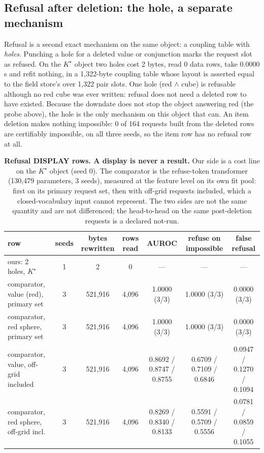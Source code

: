 \documentclass{article} %
\newcommand{\Kstar}{\ensuremath{K^{\star}}}
\begin{document}
\subsection{Refusal after deletion: the hole, a separate mechanism}
\label{sec:hole}

Refusal is a second exact mechanism on the same object: a coupling table with \emph{holes}.
Punching a hole for a deleted value or conjunction marks the request slot as refused. On the
$\Kstar$ object two holes cost 2 bytes, read 0 data rows, take 0.0000 s and refit nothing, in
a 1,322-byte coupling table whose layout is asserted equal to the field store's over 1,322 pair
slots. %
One hole (red $\wedge$ cube) is refusable although no red cube was ever written: refusal does
not need a deleted row to have existed. %
Because the downdate does not stop the object answering red (the probe above), the hole is the
only mechanism on this object that can. An item deletion makes nothing impossible: 0 of 164
requests built from the deleted rows are certifiably impossible, on all three seeds, so the
item row has no refusal row at all. %

\begin{table}[t]
\centering\small
\caption{\textbf{Refusal DISPLAY rows. A display is never a result.} Our side is a cost line
on the $\Kstar$ object (seed 0). The comparator is the refuse-token transformer (130,479
parameters, 3 seeds), measured at the feature level on its own fit pool: first on its primary
request set, then with off-grid requests included, which a closed-vocabulary input cannot
represent. The two sides are not the same quantity and are not differenced; the head-to-head on
the same post-deletion requests is a declared not-run.}
\label{tab:hole}
\setlength{\tabcolsep}{3pt}
\begin{tabular}{lcccccc}
\toprule
row & seeds & bytes rewritten & rows read & AUROC & refuse on impossible & false refusal \\
\midrule
ours: 2 holes, $\Kstar$ & 1 & 2 & 0 & --- & --- & --- \\ %
comparator, value (red), primary set & 3 & 521,916 & 4,096 & 1.0000 (3/3) & 1.0000 (3/3) & 0.0000 (3/3) \\
comparator, red sphere, primary set & 3 & 521,916 & 4,096 & 1.0000 (3/3) & 1.0000 (3/3) & 0.0000 (3/3) \\
comparator, value, off-grid included & 3 & 521,916 & 4,096 & 0.8692 / 0.8747 / 0.8755 & 0.6709 / 0.7109 / 0.6846 & 0.0947 / 0.1270 / 0.1094 \\
comparator, red sphere, off-grid incl. & 3 & 521,916 & 4,096 & 0.8269 / 0.8340 / 0.8133 & 0.5591 / 0.5709 / 0.5556 & 0.0781 / 0.0859 / 0.1055 \\
\bottomrule
\end{tabular}
\end{table}
\end{document}

